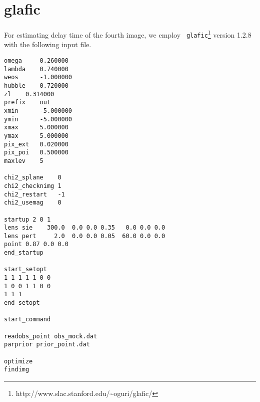 \documentclass[useAMS,usenatbib,twocolumn]{mnras}
\begin{document}
\appendix
\section{glafic}
\label{sec:glafic}

For estimating delay time of the fourth image, we employ {\tt
  glafic}\footnote{http://www.slac.stanford.edu/\~{}oguri/glafic/}
version 1.2.8 with the following input file.

\begin{verbatim}
omega     0.260000
lambda	  0.740000
weos	  -1.000000
hubble	  0.720000
zl	  0.314000
prefix	  out
xmin	  -5.000000
ymin	  -5.000000
xmax	  5.000000
ymax	  5.000000
pix_ext   0.020000
pix_poi   0.500000
maxlev	  5

chi2_splane    0
chi2_checknimg 1
chi2_restart   -1
chi2_usemag    0

startup 2 0 1
lens sie    300.0  0.0 0.0 0.35   0.0 0.0 0.0
lens pert     2.0  0.0 0.0 0.05  60.0 0.0 0.0
point 0.87 0.0 0.0
end_startup

start_setopt
1 1 1 1 1 0 0 
1 0 0 1 1 0 0 
1 1 1
end_setopt

start_command

readobs_point obs_mock.dat
parprior prior_point.dat

optimize
findimg
\end{verbatim}
\end{document}
